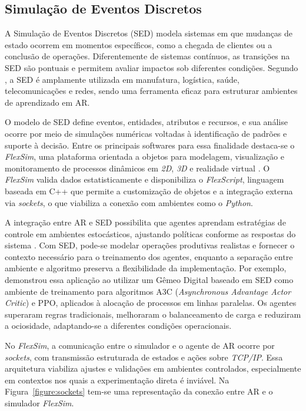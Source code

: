 \documentclass[a4paper,12pt]{article}
\begin{document}
\subsection{Simulação de Eventos Discretos}

A Simulação de Eventos Discretos (SED) modela sistemas em que mudanças de estado ocorrem em momentos específicos, como a chegada de clientes ou a conclusão de operações. Diferentemente de sistemas contínuos, as transições na SED são pontuais e permitem avaliar impactos sob diferentes condições. Segundo , a SED é amplamente utilizada em manufatura, logística, saúde, telecomunicações e redes, sendo uma ferramenta eficaz para estruturar ambientes de aprendizado em AR.

O modelo de SED define eventos, entidades, atributos e recursos, e sua análise ocorre por meio de simulações numéricas voltadas à identificação de padrões e suporte à decisão. Entre os principais softwares para essa finalidade destaca-se o \textit{FlexSim}, uma plataforma orientada a objetos para modelagem, visualização e monitoramento de processos dinâmicos em \textit{2D}, \textit{3D} e realidade virtual \cite{nordgren_flexsim_2003}. O \textit{FlexSim} valida dados estatisticamente e disponibiliza o \textit{FlexScript}, linguagem baseada em C++ que permite a customização de objetos e a integração externa via \textit{sockets}, o que viabiliza a conexão com ambientes como o \textit{Python}.

A integração entre AR e SED possibilita que agentes aprendam estratégias de controle em ambientes estocásticos, ajustando políticas conforme as respostas do sistema \cite{FlexSim_RL_2023}. Com SED, pode-se modelar operações produtivas realistas e fornecer o contexto necessário para o treinamento dos agentes, enquanto a separação entre ambiente e algoritmo preserva a flexibilidade da implementação. Por exemplo,  demonstrou essa aplicação ao utilizar um Gêmeo Digital baseado em SED como ambiente de treinamento para algoritmos A3C (\textit{Asynchronous Advantage Actor Critic}) e PPO, aplicados à alocação de processos em linhas paralelas. Os agentes superaram regras tradicionais, melhoraram o balanceamento de carga e reduziram a ociosidade, adaptando-se a diferentes condições operacionais.

No \textit{FlexSim}, a comunicação entre o simulador e o agente de AR ocorre por \textit{sockets}, com transmissão estruturada de estados e ações sobre \textit{TCP/IP}. Essa arquitetura viabiliza ajustes e validações em ambientes controlados, especialmente em contextos nos quais a experimentação direta é inviável. Na Figura~\ref{figure:sockets} tem-se uma representação da conexão entre AR e o simulador \textit{FlexSim}.
\end{document}
